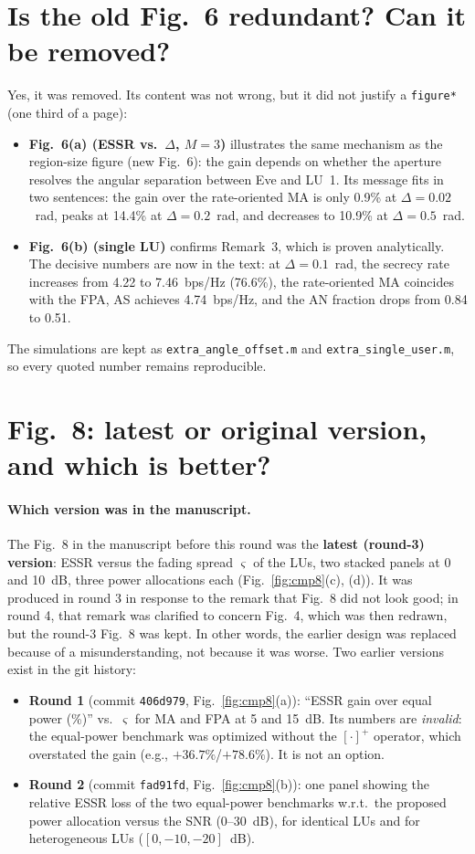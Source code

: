 \documentclass[10pt,a4paper]{article}
\newcommand{\code}[1]{\texttt{#1}}
\begin{document}
\section{Is the old Fig.~6 redundant? Can it be removed?}\label{sec:q4}
Yes, it was removed. Its content was not wrong, but it did not justify a \texttt{figure*} (one third of a page):
\begin{itemize}
\item \textbf{Fig.~6(a) (ESSR vs.\ $\Delta$, $M=3$)} illustrates the same mechanism as the region-size figure (new Fig.~6): the gain depends on whether the aperture resolves the angular separation between Eve and LU~1. Its message fits in two sentences: the gain over the rate-oriented MA is only 0.9\% at $\Delta=0.02$~rad, peaks at 14.4\% at $\Delta=0.2$~rad, and decreases to 10.9\% at $\Delta=0.5$~rad.
\item \textbf{Fig.~6(b) (single LU)} confirms Remark~3, which is proven analytically. The decisive numbers are now in the text: at $\Delta=0.1$~rad, the secrecy rate increases from 4.22 to 7.46~bps/Hz (76.6\%), the rate-oriented MA coincides with the FPA, AS achieves 4.74~bps/Hz, and the AN fraction drops from 0.84 to 0.51.
\end{itemize}
The simulations are kept as \code{extra\_angle\_offset.m} and \code{extra\_single\_user.m}, so every quoted number remains reproducible.

\section{Fig.~8: latest or original version, and which is better?}\label{sec:q5}
\paragraph{Which version was in the manuscript.} The Fig.~8 in the manuscript before this round was the \textbf{latest (round-3) version}: ESSR versus the fading spread $\varsigma$ of the LUs, two stacked panels at 0 and 10~dB, three power allocations each (Fig.~\ref{fig:cmp8}(c), (d)). It was produced in round 3 in response to the remark that Fig.~8 did not look good; in round 4, that remark was clarified to concern Fig.~4, which was then redrawn, but the round-3 Fig.~8 was kept. In other words, the earlier design was replaced because of a misunderstanding, not because it was worse. Two earlier versions exist in the git history:
\begin{itemize}
\item \textbf{Round 1} (commit \code{406d979}, Fig.~\ref{fig:cmp8}(a)): ``ESSR gain over equal power (\%)'' vs.\ $\varsigma$ for MA and FPA at 5 and 15~dB. Its numbers are \emph{invalid}: the equal-power benchmark was optimized without the $[\cdot]^+$ operator, which overstated the gain (e.g., $+36.7\%$/$+78.6\%$). It is not an option.
\item \textbf{Round 2} (commit \code{fad91fd}, Fig.~\ref{fig:cmp8}(b)): one panel showing the relative ESSR loss of the two equal-power benchmarks w.r.t.\ the proposed power allocation versus the SNR (0--30~dB), for identical LUs and for heterogeneous LUs ($[0,-10,-20]$~dB).
\end{itemize}
\end{document}
